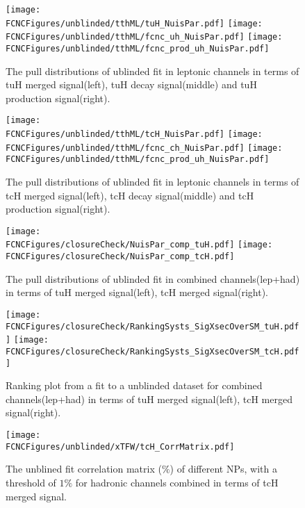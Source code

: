 \begin{figure}[H]
\centering
\texttt{[image: \\FCNCFigures/unblinded/tthML/tuH\_NuisPar.pdf]}
\texttt{[image: \\FCNCFigures/unblinded/tthML/fcnc\_uh\_NuisPar.pdf]}
\texttt{[image: \\FCNCFigures/unblinded/tthML/fcnc\_prod\_uh\_NuisPar.pdf]}
\caption{The pull distributions of ublinded fit in leptonic channels in terms of tuH merged signal(left), tuH decay signal(middle) and tuH production signal(right).}
\label{fig:tuH_NuisPar_unblind_lep}
\end{figure}

\begin{figure}[H]
\centering
\texttt{[image: \\FCNCFigures/unblinded/tthML/tcH\_NuisPar.pdf]}
\texttt{[image: \\FCNCFigures/unblinded/tthML/fcnc\_ch\_NuisPar.pdf]}
\texttt{[image: \\FCNCFigures/unblinded/tthML/fcnc\_prod\_uh\_NuisPar.pdf]}
\caption{The pull distributions of ublinded fit in leptonic channels in terms of tcH merged signal(left), tcH decay signal(middle) and tcH production signal(right).}
\label{fig:tcH_NuisPar_unblind_lep}
\end{figure}




\begin{figure}[H]
\centering
\texttt{[image: \\FCNCFigures/closureCheck/NuisPar\_comp\_tuH.pdf]}
\texttt{[image: \\FCNCFigures/closureCheck/NuisPar\_comp\_tcH.pdf]}
\caption{The pull distributions of ublinded fit in combined channels(lep+had) in terms of tuH merged signal(left), tcH merged signal(right).}
\label{fig:NuisPar_unblind_lep_had}
\end{figure}



\begin{figure}[H]
\centering
\texttt{[image: \\FCNCFigures/closureCheck/RankingSysts\_SigXsecOverSM\_tuH.pdf]}
\texttt{[image: \\FCNCFigures/closureCheck/RankingSysts\_SigXsecOverSM\_tcH.pdf]}
\caption{ Ranking plot from a fit to a unblinded dataset for combined channels(lep+had) in terms of tuH merged signal(left), tcH merged signal(right).}
\label{fig:rank_lep_had}
\end{figure}




\begin{figure}[H]
\centering
\texttt{[image: \\FCNCFigures/unblinded/xTFW/tcH\_CorrMatrix.pdf]}
\caption{ The unblined fit correlation matrix ($\%$) of different NPs, with a threshold of $1\%$ for hadronic channels combined in terms of tcH merged signal.}
\label{fig:tcH_CorrMatrix_1}
\end{figure}

